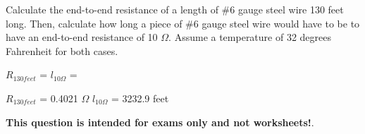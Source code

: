 

Calculate the end-to-end resistance of a length of \#6 gauge steel wire 130 feet long.  Then, calculate how long a piece of \#6 gauge steel wire would have to be to have an end-to-end resistance of 10 $\Omega$.  Assume a temperature of 32 degrees Fahrenheit for both cases.

\vskip 10pt

$R_{130feet}$ = \hskip 150pt $l_{10\Omega}$ = 







$R_{130feet}$ = 0.4021 $\Omega$ \hskip 100pt $l_{10\Omega}$ = 3232.9 feet







{\bf This question is intended for exams only and not worksheets!}.




